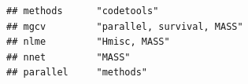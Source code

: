 \documentclass[]{article}
\begin{document}
\begin{verbatim}
## methods      "codetools"                                                                                                                                                                                                                                                                                                                                                                                                                                                                                                                                                                               
## mgcv         "parallel, survival, MASS"                                                                                                                                                                                                                                                                                                                                                                                                                                                                                                                                                                
## nlme         "Hmisc, MASS"                                                                                                                                                                                                                                                                                                                                                                                                                                                                                                                                                                             
## nnet         "MASS"                                                                                                                                                                                                                                                                                                                                                                                                                                                                                                                                                                                    
## parallel     "methods"                                                                                                                                                                                                                                                                                                                                                                                                                                                                                                                                                                                 

\end{verbatim}
\end{document}
